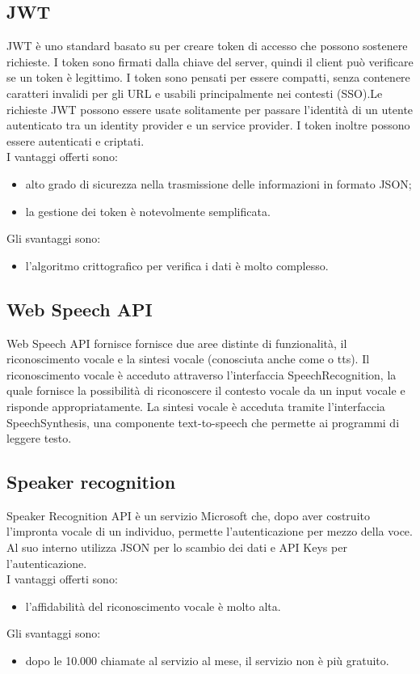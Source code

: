 \subsection{JWT}
JWT è uno standard basato su  per creare token di accesso che possono sostenere richieste. I token sono firmati dalla chiave del server, quindi il client può verificare se un token è legittimo. I token sono pensati per essere compatti, senza contenere caratteri invalidi per gli URL e usabili principalmente nei contesti  (SSO).Le richieste JWT possono essere usate solitamente per passare l'identità di un utente autenticato tra un identity provider e un service provider. I token inoltre possono essere autenticati e criptati.\\
I vantaggi offerti sono:
\begin{itemize}
	\item alto grado di sicurezza nella trasmissione delle informazioni in formato JSON;
	\item la gestione dei token è notevolmente semplificata.
\end{itemize}
Gli svantaggi sono:
\begin{itemize}
	\item l'algoritmo crittografico per verifica i dati è molto complesso.
\end{itemize}
\subsection{Web Speech API}
Web Speech API fornisce fornisce due aree distinte di funzionalità, il riconoscimento vocale e la sintesi vocale (conosciuta anche come  o tts).
Il riconoscimento vocale è acceduto attraverso l'interfaccia SpeechRecognition, la quale fornisce la possibilità di riconoscere il contesto vocale da un input vocale e risponde appropriatamente.
La sintesi vocale è acceduta tramite l'interfaccia SpeechSynthesis, una componente text-to-speech che permette ai programmi di leggere testo.

\subsection{Speaker recognition}
Speaker Recognition API è un servizio Microsoft che, dopo aver costruito l'impronta vocale di un individuo, permette l'autenticazione per mezzo della voce. Al suo interno utilizza JSON per lo scambio dei dati e API Keys per l'autenticazione.
\\
I vantaggi offerti sono:
\begin{itemize}
	\item l'affidabilità del riconoscimento vocale è molto alta.
\end{itemize}
Gli svantaggi sono:
\begin{itemize}
	\item dopo le 10.000 chiamate al servizio al mese, il servizio non è più gratuito.
\end{itemize}
